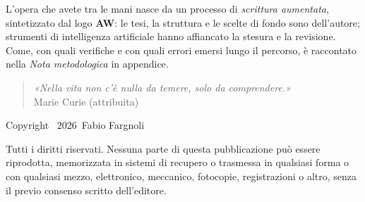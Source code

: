 \documentclass[11pt,twoside]{book}
\newcommand{\authorname}{Fabio Fargnoli}
\newcommand{\editionyear}{2026}
\begin{document}
\frontmatter
\pagestyle{empty}


\clearpage
\null
\thispagestyle{empty}
\clearpage


\cleardoublepage
\thispagestyle{empty}
\vspace*{\fill}

\noindent
{\small\justifying
	L'opera che avete tra le mani nasce da un processo di \textit{scrittura aumentata}, sintetizzato dal logo \textbf{AW}: le tesi, la struttura e le scelte di fondo sono dell'autore; strumenti di intelligenza artificiale hanno affiancato la stesura e la revisione. Come, con quali verifiche e con quali errori emersi lungo il percorso, è raccontato nella \textit{Nota metodologica} in appendice.
	
	\begin{quote}
		\textit{«Nella vita non c'è nulla da temere, solo da comprendere.»}\\
		\hfill Marie Curie (attribuita)
	\end{quote}\par}

\vspace{2.5em}

\noindent
Copyright \textcopyright\ \editionyear\ \authorname

\vspace{0.5em}

\noindent
\small
Tutti i diritti riservati. Nessuna parte di questa pubblicazione può essere 
riprodotta, memorizzata in sistemi di recupero o trasmessa in qualsiasi forma 
o con qualsiasi mezzo, elettronico, meccanico, fotocopie, registrazioni o altro, 
senza il previo consenso scritto dell'editore.

\normalsize

\cleardoublepage

\pagestyle{plain}
\cleardoublepage

\tableofcontents
\cleardoublepage

\mainmatter


\pagestyle{prologue}
\cleardoublepage
\pagestyle{mainmatter}
\end{document}
